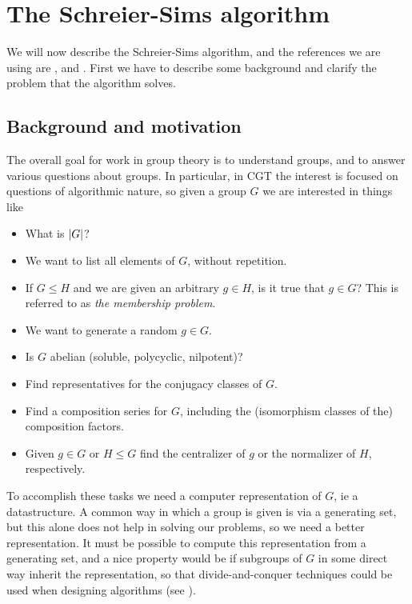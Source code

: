 \chapter{The Schreier-Sims algorithm}

We will now describe the Schreier-Sims algorithm, and the references we are using are \cite{soicher98}, \cite{seress03} and \cite{butler91}. First we have to describe some background and clarify the problem that the algorithm solves.

\section{Background and motivation} \label{ss_background}
The overall goal for work in group theory is to understand groups, and
to answer various questions about groups. In particular, in CGT the
interest is focused on questions of algorithmic nature, so given a
group $G$ we are interested in things like
\begin{itemize}
\item What is $\left\lvert G \right\rvert$?
\item We want to list all elements of $G$, without repetition.
\item If $G \leq H$ and we are given an arbitrary $g \in H$, is it true that $g \in G$? This is referred to as \emph{the membership problem}.
\item We want to generate a random $g \in G$.
\item Is $G$ abelian (soluble, polycyclic, nilpotent)?
\item Find representatives for the conjugacy classes of $G$.
\item Find a composition series for $G$, including the (isomorphism classes of the) composition factors.
\item Given $g \in G$ or $H \leq G$ find the centralizer of $g$ or the normalizer of $H$, respectively.
\end{itemize}
To accomplish these tasks we need a computer representation of $G$, ie
a datastructure. A common way in which a group is given is via a
generating set, but this alone does not help in solving our problems,
so we need a better representation. It must be possible to compute
this representation from a generating set, and a nice property would
be if subgroups of $G$ in some direct way inherit the representation,
so that divide-and-conquer techniques could be used when designing
algorithms (see \cite{clr90}).

